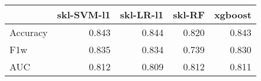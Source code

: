 \begin{tabular}{lrrrr}
\toprule
{} &  skl-SVM-l1 &  skl-LR-l1 &  skl-RF &  xgboost \\
\midrule
Accuracy &       0.843 &      0.844 &   0.820 &    0.843 \\
F1w      &       0.835 &      0.834 &   0.739 &    0.830 \\
AUC      &       0.812 &      0.809 &   0.812 &    0.811 \\
\bottomrule
\end{tabular}
